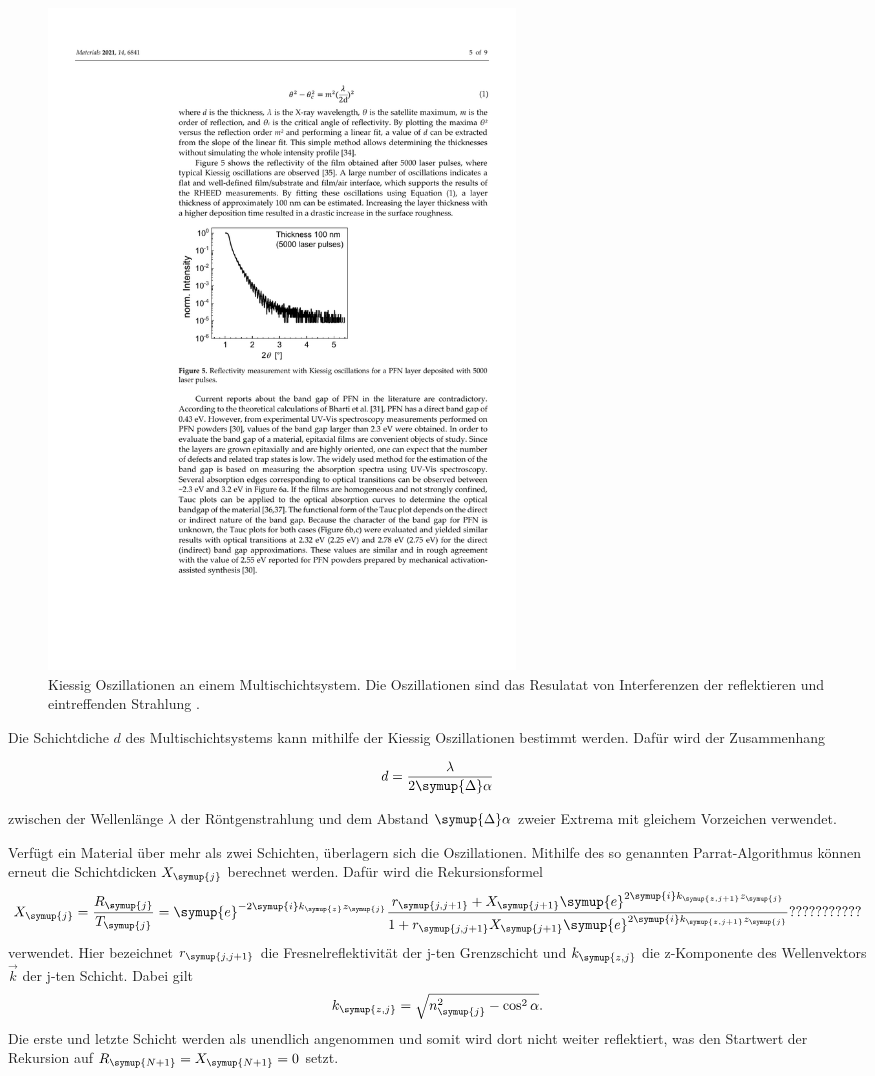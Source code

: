 \begin{figure}
    \centering
    \includegraphics[width=0.6\textwidth]{content/pics/kiessig_oscillation.pdf}
    \caption{Kiessig Oszillationen an einem Multischichtsystem. Die Oszillationen sind das Resulatat von Interferenzen der reflektieren und eintreffenden %
    Strahlung \cite{kiessig_oscillation}.}
    \label{fig:kiessig_oscillation}
\end{figure}

Die Schichtdiche $d$ des Multischichtsystems kann mithilfe der Kiessig Oszillationen bestimmt werden. Dafür wird der Zusammenhang

\begin{equation}
    d = \frac{\lambda}{2\symup{\Delta}\alpha}
    \label{eq:Schichtdicke}
\end{equation}

zwischen der Wellenlänge $\lambda$ der Röntgenstrahlung und dem Abstand $\symup{\Delta}\alpha$ zweier Extrema mit gleichem Vorzeichen verwendet.

Verfügt ein Material über mehr als zwei Schichten, überlagern sich die Oszillationen. Mithilfe des so genannten Parrat-Algorithmus können erneut die Schichtdicken $X_{\symup{j}}$ berechnet werden.
Dafür wird die Rekursionsformel
\begin{equation}
    X_{\symup{j}} = \frac{R_{\symup{j}}}{T_{\symup{j}}} = \symup{e}^{-2\symup{i}k_{\symup{z}}z_{\symup{j}}}\frac{r_{\symup{j,j+1}}+X_{\symup{j+1}}\symup{e}^{2\symup{i}k_{\symup{z,j+1}}z_{\symup{j}}}}%
    {1+r_{\symup{j,j+1}}X_{\symup{j+1}}\symup{e}^{2\symup{i}k_{\symup{z,j+1}}z_{\symup{j}}}} ???????????
    \label{eq:Parrat}
\end{equation}
verwendet. Hier bezeichnet $r_{\symup{j,j+1}}$ die Fresnelreflektivität der j-ten Grenzschicht und $k_{\symup{z,j}}$ die z-Komponente des Wellenvektors $\vec{k}$ der j-ten Schicht.
Dabei gilt
\begin{equation*}
    k_{\symup{z,j}} = \sqrt{n_{\symup{j}}^2 -\cos^2 \alpha}.
\end{equation*}
Die erste und letzte Schicht werden als unendlich angenommen und somit wird dort nicht weiter reflektiert, was den Startwert der Rekursion auf $R_{\symup{N+1}} = X_{\symup{N+1}} = 0$ setzt.

